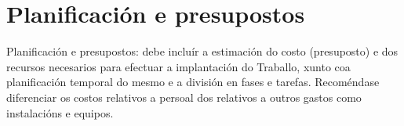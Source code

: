 \chapter{Planificación e presupostos}

Planificación e presupostos: debe incluír a estimación do costo (presuposto) e
dos recursos necesarios para efectuar a implantación do Traballo, xunto coa
planificación temporal do mesmo e a división en fases e tarefas. Recoméndase
diferenciar os costos relativos a persoal dos relativos a outros gastos como
instalacións e equipos.
